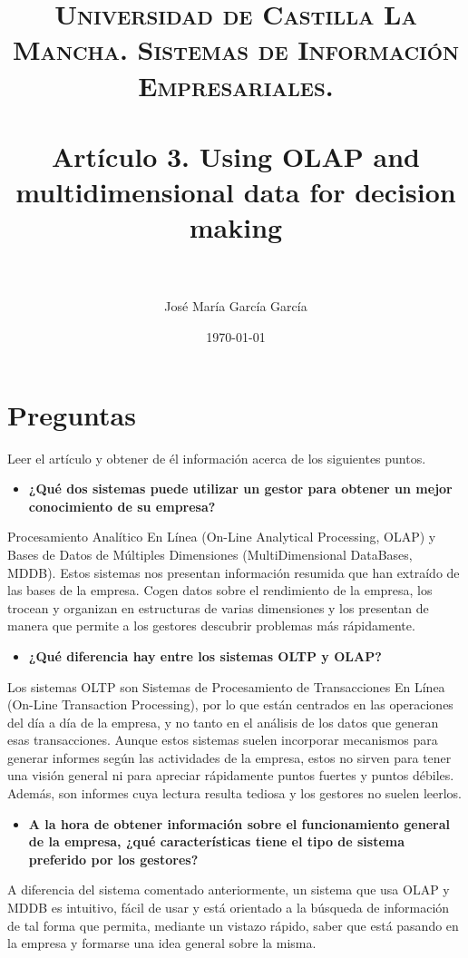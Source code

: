 \documentclass[paper=a4, fontsize=11pt]{scrartcl} %
\title{	
\normalfont \normalsize 
\textsc{Universidad de Castilla La Mancha. Sistemas de Información Empresariales.} \\ [25pt] %
\horrule{0.5pt} \\[0.4cm] %
\huge Artículo 3. Using OLAP and multidimensional data for decision making \\ %
\horrule{2pt} \\[0.5cm] %
}
\author{José María García García} %
\date{\normalsize\today} %
\begin{document}
\maketitle %


\section{Preguntas}

Leer el artículo y obtener de él información acerca de los siguientes puntos.

\begin{itemize}
\item \textbf{ ¿Qué dos sistemas puede utilizar un gestor para obtener un mejor conocimiento de su empresa?}
\end{itemize}
Procesamiento Analítico En Línea (On-Line Analytical Processing, OLAP) y Bases de Datos de Múltiples Dimensiones (MultiDimensional DataBases, MDDB). Estos sistemas nos presentan información resumida que han extraído de las bases de la empresa. Cogen datos sobre el rendimiento de la empresa, los trocean y organizan en estructuras de varias dimensiones y los presentan de manera que permite a los gestores descubrir problemas más rápidamente. 

\begin{itemize}
\item \textbf{¿Qué diferencia hay entre los sistemas OLTP y OLAP?}
\end{itemize}
Los sistemas OLTP son Sistemas de Procesamiento de Transacciones En Línea (On-Line Transaction Processing), por lo que están centrados en las operaciones del día a día de la empresa, y no tanto en el análisis de los datos que generan esas transacciones. Aunque estos sistemas suelen incorporar mecanismos para generar informes según las actividades de la empresa, estos no sirven para tener una visión general ni para apreciar rápidamente puntos fuertes y puntos débiles. Además, son informes cuya lectura resulta tediosa y los gestores no suelen leerlos. 

\begin{itemize}
\item \textbf{A la hora de obtener información sobre el funcionamiento general de la empresa, ¿qué características tiene el tipo de sistema preferido por los gestores?}
\end{itemize}
A diferencia del sistema comentado anteriormente, un sistema que usa OLAP y MDDB es intuitivo, fácil de usar y está orientado a la búsqueda de información de tal forma que permita, mediante un vistazo rápido, saber que está pasando en la empresa y formarse una idea general sobre la misma.
\end{document}
